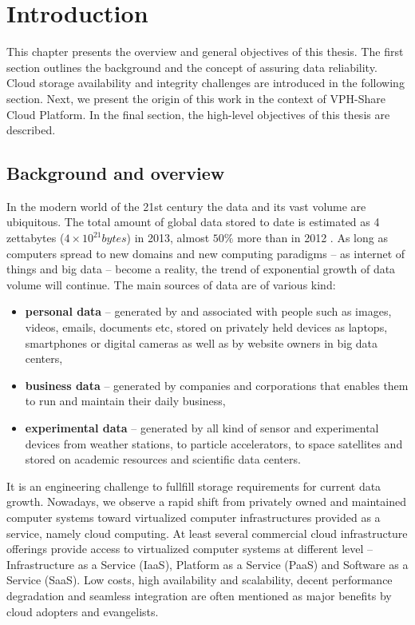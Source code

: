 \chapter{Introduction}
\label{cha:introduction}

This chapter presents the overview and general objectives of this thesis.
The first section outlines the background and the concept of
assuring data reliability. Cloud storage availability and integrity challenges
are introduced in the following section. Next, we present the origin of
this work in the context of VPH-Share Cloud Platform. In the final section,
the high-level objectives of this thesis are described.
 
\section{Background and overview}
In the modern world of the 21st century the data and its vast volume
are ubiquitous. The total amount of global data stored to date is estimated
as 4 zettabytes ($4 \times 10^{21}bytes$) in 2013, almost $50\%$ more than in 2012 \cite{idc-data-growth}.
As long as computers spread to 
new domains and new computing paradigms -- as internet of things and big data
-- become a reality, the trend of exponential growth of data volume
will continue. The main sources of data are of various kind:

\begin{itemize}
\item \textbf{personal data} -- generated by and associated with people such as
images, videos, emails, documents etc, stored on privately held devices as
laptops, smartphones or digital cameras as well as by website owners in
big data centers,
\item \textbf{business data} -- generated by companies and corporations
that enables them to run and maintain their daily business,
\item \textbf{experimental data} -- generated by all kind of sensor and
experimental devices from weather stations, to particle accelerators, to
space satellites and stored on academic resources and scientific data centers.
\end{itemize}

It is an engineering challenge to fullfill storage requirements for current
data growth. Nowadays, we observe a rapid shift from privately owned and maintained
computer systems toward virtualized computer infrastructures provided as a service,
namely cloud computing. At least several commercial cloud infrastructure offerings 
provide access to virtualized computer systems at different level -- Infrastructure
as a Service (IaaS), Platform as a Service (PaaS) and Software as a Service (SaaS).
Low costs, high availability and scalability, decent performance degradation and 
seamless integration are often mentioned as major benefits by cloud adopters and
evangelists.\\

